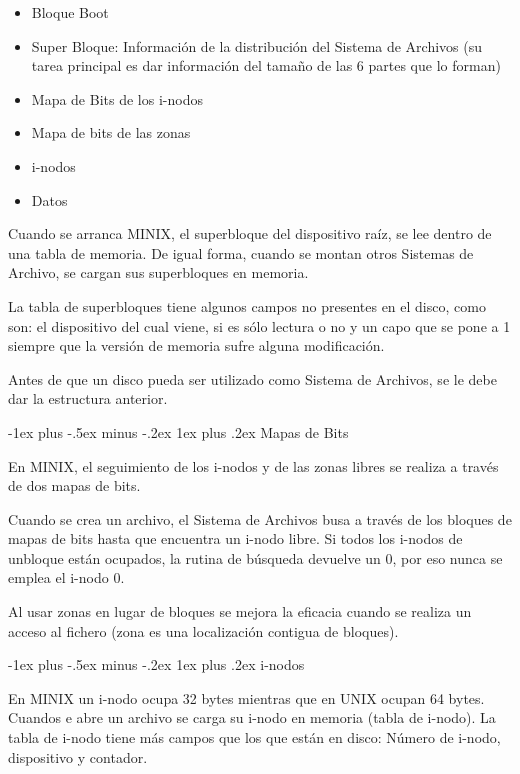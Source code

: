 \documentclass[10pt,portrait, twocolumn]{article}
\makeatletter
\renewcommand{\subsubsection}{\@startsection{subsubsection}{3}{0mm}%
                                {-1ex plus -.5ex minus -.2ex}%
                                {1ex plus .2ex}%
                                {\normalfont\small\bfseries}}
\makeatother
\begin{document}
	\begin{itemize}
		\item Bloque Boot
		\item Super Bloque: Información de la distribución del Sistema de Archivos (su tarea principal es dar información del tamaño de las 6 partes que lo forman)
		\item Mapa de Bits de los i-nodos
		\item Mapa de bits de las zonas
		\item i-nodos
		\item Datos
	\end{itemize}
	
Cuando se arranca MINIX, el superbloque del dispositivo raíz, se lee dentro de una tabla de memoria. De igual forma, cuando se montan otros Sistemas de Archivo, se cargan sus superbloques en memoria.

	\quad La tabla de superbloques tiene algunos campos no presentes en el disco, como son: el dispositivo del cual viene, si es sólo lectura o no y un capo que se pone a 1 siempre que la versión de memoria sufre alguna modificación.
	
		\quad Antes de que un disco pueda ser utilizado como Sistema de Archivos, se le debe dar la estructura anterior.
		
\subsubsection{Mapas de Bits}

En MINIX, el seguimiento de los i-nodos y de las zonas libres se realiza a través de dos mapas de bits. 

	\quad Cuando se crea un archivo, el Sistema de Archivos busa a través de los bloques de mapas de bits hasta que encuentra un i-nodo libre. Si todos los i-nodos de unbloque están ocupados, la rutina de búsqueda devuelve un 0, por eso nunca se emplea el i-nodo 0.
	
	\quad Al usar zonas en lugar de bloques se mejora la eficacia cuando se realiza un acceso al fichero (zona es una localización contigua de bloques).
	
\subsubsection{i-nodos}

En MINIX un i-nodo ocupa 32 bytes mientras que en UNIX ocupan 64 bytes. Cuandos e abre un archivo se carga su i-nodo en memoria (tabla de i-nodo). La tabla de i-nodo tiene más campos que los que están en disco: Número de i-nodo, dispositivo y contador.
\end{document}
